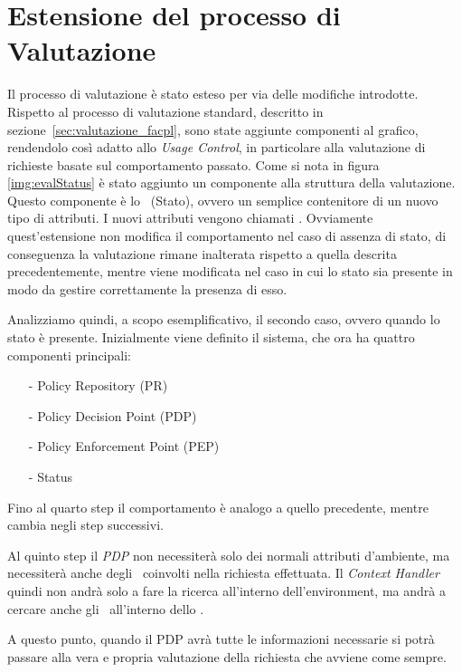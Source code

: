 \section{Estensione del processo di Valutazione} %
\label{sec:estensione_del_processo_di_valutazione}
Il processo di valutazione è stato esteso per via delle modifiche introdotte. 
Rispetto al processo di valutazione standard, descritto in sezione~\ref{sec:valutazione_facpl}, sono state aggiunte
componenti al grafico, rendendolo così adatto allo \textit{Usage Control}, in particolare alla valutazione di 
richieste basate sul comportamento passato.
Come si nota in figura \ref{img:evalStatus} è stato aggiunto un componente alla struttura della valutazione.
Questo componente è lo \status \ (Stato), ovvero un semplice contenitore di un nuovo tipo di attributi.
I nuovi attributi vengono chiamati \statusattribute. Ovviamente quest'estensione non modifica il comportamento nel caso di assenza di stato, di conseguenza la valutazione rimane inalterata rispetto a quella descrita precedentemente, mentre viene modificata nel caso in cui lo stato sia presente in modo da gestire correttamente la presenza di esso.\\ \par
Analizziamo quindi, a scopo esemplificativo, il secondo caso, ovvero quando lo stato è presente. Inizialmente viene definito il sistema, che ora ha quattro componenti principali:
\begin{itemize}
	\item[-]{Policy Repository (PR)}
	\item[-]{Policy Decision Point (PDP)}
	\item[-]{Policy Enforcement Point (PEP)}
	\item[-]{Status}
\end{itemize}
Fino al quarto step il comportamento è analogo a quello precedente, mentre cambia negli step successivi.\\ \par
Al quinto step il \textit{PDP} non necessiterà solo dei normali attributi d'ambiente, ma necessiterà anche degli \statusattribute \ coinvolti nella richiesta effettuata. Il \textit{Context Handler} quindi non andrà solo a fare la ricerca all'interno dell'environment, ma andrà a cercare anche gli \statusattribute \ all'interno dello \status.\\ \par
A questo punto, quando il PDP avrà tutte le informazioni necessarie si potrà passare alla vera e propria valutazione della richiesta che avviene come sempre.\\ \par
